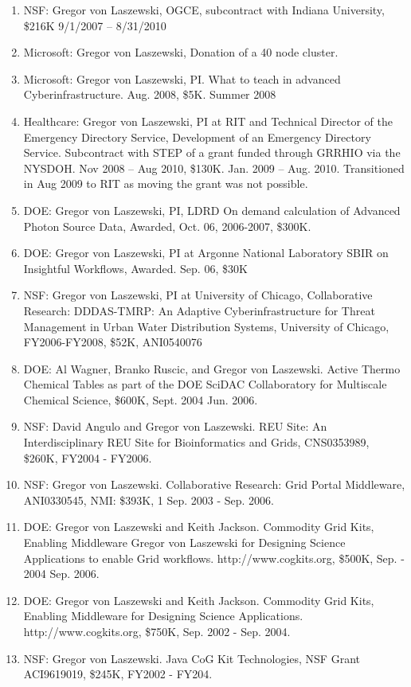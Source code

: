 \documentclass{article}
\begin{document}
\begin{enumerate}
\item  NSF: Gregor von Laszewski, OGCE, subcontract with Indiana University, \$216K 9/1/2007 – 8/31/2010
\item  Microsoft: Gregor von Laszewski, Donation of a 40 node cluster. 
\item  Microsoft: Gregor von Laszewski, PI. What to teach in advanced Cyberinfrastructure. Aug. 2008, \$5K. Summer 2008
\item  Healthcare: Gregor von Laszewski, PI at RIT and Technical Director of the Emergency Directory Service, Development of an Emergency Directory Service. Subcontract with STEP of a grant funded through GRRHIO via the NYSDOH. Nov 2008 – Aug 2010, \$130K. Jan. 2009 – Aug. 2010. Transitioned in Aug 2009 to RIT as moving the grant was not possible.
\item  DOE: Gregor von Laszewski, PI, LDRD On demand calculation of Advanced Photon Source Data, Awarded, Oct. 06, 2006-2007, \$300K. 
\item  DOE: Gregor von Laszewski, PI at Argonne National Laboratory SBIR on Insightful Workflows, Awarded. Sep. 06, \$30K 
\item  NSF: Gregor von Laszewski, PI at University of Chicago, Collaborative Research: DDDAS-TMRP: An Adaptive Cyberinfrastructure for Threat Management in Urban Water Distribution Systems, University of Chicago, FY2006-FY2008, \$52K, ANI0540076 
\item  DOE: Al Wagner, Branko Ruscic, and Gregor von Laszewski. Active Thermo Chemical Tables as part of the DOE SciDAC Collaboratory for Multiscale Chemical Science, \$600K, Sept. 2004 Jun. 2006. 
\item  NSF: David Angulo and Gregor von Laszewski. REU Site: An Interdisciplinary REU Site for Bioinformatics and Grids, CNS0353989, \$260K, FY2004 - FY2006. 
\item  NSF: Gregor von Laszewski. Collaborative Research: Grid Portal Middleware, ANI0330545, NMI: \$393K, 1 Sep. 2003 - Sep. 2006. 
\item  DOE: Gregor von Laszewski and Keith Jackson. Commodity Grid Kits, Enabling Middleware Gregor von Laszewski for Designing Science Applications to enable Grid workflows. http://www.cogkits.org, \$500K, Sep. - 2004 Sep. 2006. 
\item  DOE: Gregor von Laszewski and Keith Jackson. Commodity Grid Kits, Enabling Middleware for Designing Science Applications. http://www.cogkits.org, \$750K, Sep. 2002 - Sep. 2004. 
\item  NSF: Gregor von Laszewski. Java CoG Kit Technologies, NSF Grant ACI9619019, \$245K, FY2002 - FY204. 

\end{enumerate}
\end{document}
